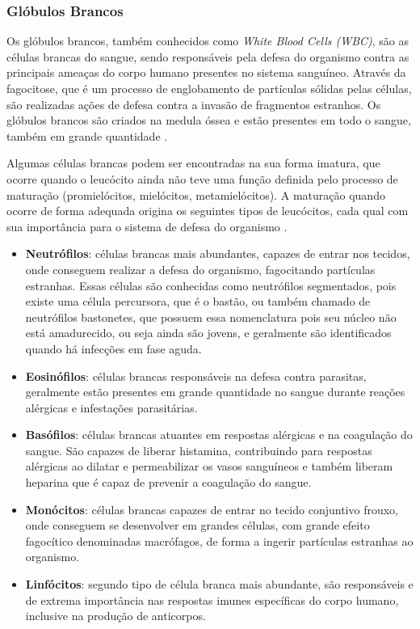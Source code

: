 \subsubsection{Glóbulos Brancos}
Os glóbulos brancos, também conhecidos como \emph{White Blood Cells (WBC)}, são as células brancas do sangue, sendo responsáveis pela defesa do organismo contra as principais ameaças do corpo humano presentes no sistema sanguíneo. Através da fagocitose, que é um processo de englobamento de partículas sólidas pelas células, são realizadas ações de defesa contra a invasão de fragmentos estranhos. Os glóbulos brancos são criados na medula óssea e estão presentes em todo o sangue, também em grande quantidade \cite{manualHematologia}.

Algumas células brancas podem ser encontradas na sua forma imatura, que ocorre quando o leucócito ainda não teve uma função definida pelo processo de maturação (promielócitos, mielócitos, metamielócitos). A maturação quando ocorre de forma adequada origina os seguintes tipos de leucócitos, cada qual com sua importância para o sistema de defesa do organismo \cite{manualHematologia}.

\begin{itemize}
	\item \textbf{Neutrófilos}: células brancas mais abundantes, capazes de entrar nos tecidos, onde conseguem realizar a defesa do organismo, fagocitando partículas estranhas. Essas células são conhecidas como neutrófilos segmentados, pois existe uma célula percursora, que é o bastão, ou também chamado de neutrófilos bastonetes, que possuem essa nomenclatura pois seu núcleo não está amadurecido, ou seja ainda são jovens, e geralmente são identificados quando há infecções em fase aguda. 
	\item \textbf{Eosinófilos}: células brancas responsáveis na defesa contra parasitas, geralmente estão presentes em grande quantidade no sangue durante reações alérgicas e infestações parasitárias.
	\item \textbf{Basófilos}: células brancas atuantes em respostas alérgicas e na coagulação do sangue. São capazes de liberar histamina, contribuindo para respostas alérgicas ao dilatar e permeabilizar os vasos sanguíneos e também liberam heparina que é capaz de prevenir a coagulação do sangue.
	\item \textbf{Monócitos}: células brancas capazes de entrar no tecido conjuntivo frouxo, onde conseguem se desenvolver em grandes células, com grande efeito fagocítico denominadas macrófagos, de forma a ingerir partículas estranhas ao organismo.
	\item \textbf{Linfócitos}: segundo tipo de célula branca mais abundante, são responsáveis e de extrema importância nas respostas imunes específicas do corpo humano, inclusive na produção de anticorpos.
\end{itemize}


